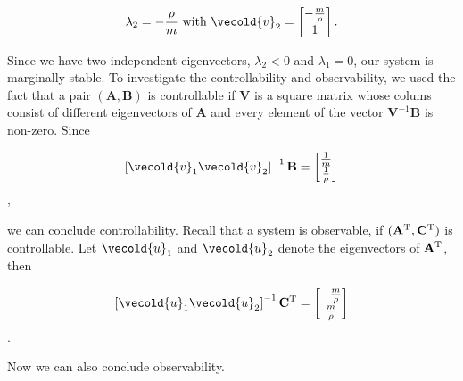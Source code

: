 \documentclass[11pt,titlepage]{report}
\newcommand{\mat}[1]{\mathbf{#1}}
\let\vec\vecold
\newcommand{\vec}[1]{\mathbf{\underline{#1}}}
\newcommand{\tr}[1]{#1^{\text T}}
\begin{document}
\begin{equation}
	\lambda_2 = -\frac{\rho}{m}\text{ with }
	\vec{v}_2 = \begin{bmatrix}
		-\frac{m}{\rho} \\
		1
	\end{bmatrix}.
\end{equation}

Since we have two independent eigenvectors, $\lambda_2 < 0$ and $\lambda_1 = 0$, our system is marginally stable. To investigate the controllability and observability, we used the fact that a pair $(\mat{A},\mat{B})$ is controllable if $\mat{V}$ is a square matrix whose colums consist of different eigenvectors of $\mat{A}$ and every element of the vector $\mat{V}^{-1} \mat{B}$ is non-zero. Since

\begin{equation}
	\left[\vec{v}_1 \vec{v}_2 \right]^{-1} \mat{B} = \begin{bmatrix}
		\frac{1}{m} \\
		\frac{1}{\rho}
	\end{bmatrix}
\end{equation},

we can conclude controllability. Recall that a system is observable, if $(\tr{\mat{A}},\tr{\mat{C}})$ is controllable. Let $\vec{u}_1$ and $\vec{u}_2$ denote the eigenvectors of $\tr{\mat{A}}$, then

\begin{equation}
	\left[\vec{u}_1 \vec{u}_2 \right]^{-1} \tr{\mat{C}} = \begin{bmatrix}
		-\frac{m}{\rho} \\
		\frac{m}{\rho}
	\end{bmatrix}
\end{equation}.

Now we can also conclude observability.
\end{document}
